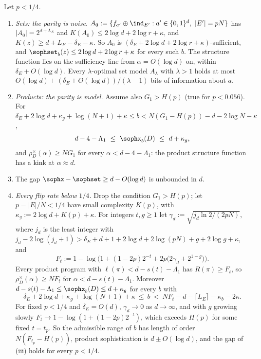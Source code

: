 \begin{proposition}\label{prop:algstat:parity}
Let $p<1/4$.
\begin{enumerate}[label=(\roman*)]
\item \emph{Sets: the parity is noise.} $A_0:=\{f_{a'}\oplus\ind_{E'}:a'\in\{0,1\}^d,\ |E'|=pN\}$ has $|A_0|=2^{d+L_E}$ and $K(A_0)\le2\log d+2\log r+\kappa$, and $K(z)\ge d+L_E-\delta_E-\kappa$. So $A_0$ is $(\delta_E+2\log d+2\log r+\kappa)$-sufficient, and $\sophset_b(z)\le2\log d+2\log r+\kappa$ for every such $b$. The structure function lies on the sufficiency line from $\alpha=O(\log d)$ on, within $\delta_E+O(\log d)$. Every $\lambda$-optimal set model $A_\lambda$ with $\lambda>1$ holds at most $O(\log d)+(\delta_E+O(\log d))/(\lambda-1)$ bits of information about $a$.
\item \emph{Products: the parity is model.} Assume also $G_1>H(p)$ (true for $p<0.056$). For $\delta_E+2\log d+\kappa_g+\log(N+1)+\kappa\le b<N(G_1-H(p))-d-2\log N-\kappa$,
\[
d-4-\Lambda_1\ \le\ \sophx_b(D)\ \le\ d+\kappa_g,
\]
and $\rho^\times_D(\alpha)\ge NG_1$ for every $\alpha<d-4-\Lambda_1$: the product structure function has a kink at $\alpha\approx d$.
\item The gap $\sophx-\sophset\ge d-O(\log d)$ is unbounded in $d$.
\item \emph{Every flip rate below $1/4$.} Drop the condition $G_1>H(p)$; let $p=|E|/N<1/4$ have small complexity $K(p)$, with $\kappa_g:=2\log d+K(p)+\kappa$. For integers $t,g\ge1$ let $\gamma_d:=\sqrt{j_d\ln2/(2pN)}$, where $j_d$ is the least integer with $j_d-2\log(j_d+1)>\delta_E+d+1+2\log d+2\log(pN)+g+2\log g+\kappa$, and
\[
F_t:=1-\log\Big(1+(1-2p)2^{-t}+2p\big(2\gamma_d+2^{1-g}\big)\Big).
\]
Every product program with $\ell(\pi)<d-s(t)-\Lambda_1$ has $R(\pi)\ge F_t$, so $\rho^\times_D(\alpha)\ge NF_t$ for $\alpha<d-s(t)-\Lambda_1$. Moreover $d-s(t)-\Lambda_1\le\sophx_b(D)\le d+\kappa_g$ for every $b$ with
\[
\delta_E+2\log d+\kappa_g+\log(N+1)+\kappa\ \le\ b\ <\ NF_t-d-\lceil L_E\rceil-\kappa_b-2\kappa.
\]
For fixed $p<1/4$ and $\delta_E=O(d)$, $\gamma_d\to0$ as $d\to\infty$, and with $g$ growing slowly $F_t\to1-\log(1+(1-2p)2^{-t})$, which exceeds $H(p)$ for some fixed $t=t_p$. So the admissible range of $b$ has length of order $N(F_{t_p}-H(p))$, product sophistication is $d\pm O(\log d)$, and the gap of (iii) holds for every $p<1/4$.
\end{enumerate}
\end{proposition}

